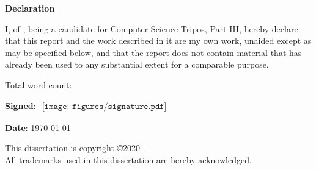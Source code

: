 \newpage
{\Huge \bf Declaration}

\vspace{24pt} 

I, \authorname of \authorcollege, being a candidate for Computer Science Tripos, Part III, hereby declare that this report and the work described in it are my own work, unaided except as may be specified below, and that the report does not contain material that has already been used to any substantial extent for a comparable purpose.

\vspace{24pt}
Total word count: 

\vspace{60pt}
\textbf{Signed}: $
\begin{array}{l}
\texttt{[image: figures/signature.pdf]}
\end{array}
$

\vspace{12pt}
\textbf{Date}: \today


\vfill

This dissertation is copyright \copyright 2020 \authorname. 
\\
All trademarks used in this dissertation are hereby acknowledged.



\newpage
\vspace*{\fill}
